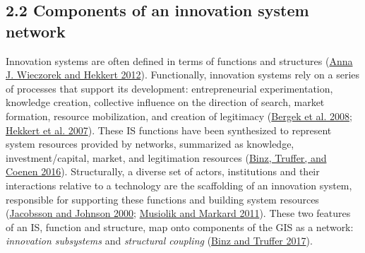 \documentclass[twoside,12pt,final]{ucthesis-CA2012}
\begin{document}
\begin{ucmainmatter}
\hypertarget{components-of-an-innovation-system-network}{%
\subsection{2.2 Components of an innovation system network}\label{components-of-an-innovation-system-network}}

Innovation systems are often defined in terms of functions and
structures
(\protect\hyperlink{ref-Wieczorek_Hekkert_2012}{Anna J. Wieczorek and Hekkert 2012}).
Functionally, innovation systems rely on a series of processes that
support its development: entrepreneurial experimentation, knowledge
creation, collective influence on the direction of search, market
formation, resource mobilization, and creation of legitimacy
(\protect\hyperlink{ref-Bergek_Jacobsson_Carlsson_Lindmark_Rickne_2008}{Bergek et al. 2008}; \protect\hyperlink{ref-Hekkert_Suurs_Negro_Kuhlmann_Smits_2007}{Hekkert et al. 2007}).
These IS functions have been synthesized to represent \textquotesingle system
resources\textquotesingle{} provided by networks, summarized as knowledge,
investment/capital, market, and legitimation resources
(\protect\hyperlink{ref-Binz_Truffer_Coenen_2016}{Binz, Truffer, and Coenen 2016}).
Structurally, a diverse set of actors, institutions and their
interactions relative to a technology are the scaffolding of an
innovation system, responsible for supporting these functions and
building system resources
(\protect\hyperlink{ref-Jacobsson_Johnson_2000}{Jacobsson and Johnson 2000}; \protect\hyperlink{ref-Musiolik_Markard_2011}{Musiolik and Markard 2011}).
These two features of an IS, function and structure, map onto components
of the GIS as a network: \emph{innovation subsystems} and \emph{structural
coupling}
(\protect\hyperlink{ref-Binz_Truffer_2017}{Binz and Truffer 2017}).


\end{ucmainmatter}
\end{document}
